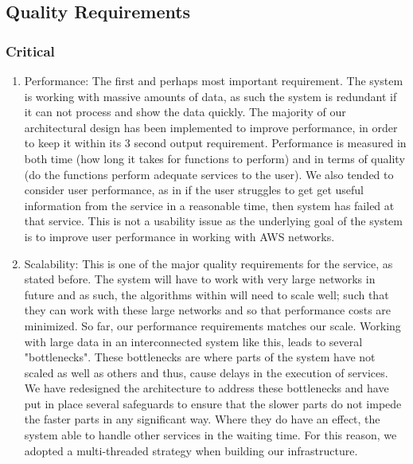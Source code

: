 \documentclass[hidelinks,a4paper,12pt]{article}
\begin{document}
\newpage
\subsection{Quality Requirements}
\subsubsection {Critical}
\begin{enumerate} 
\item Performance: The first and perhaps most important requirement. The system is working with massive amounts of data, as such the system is redundant if it can not process and show the data quickly. The majority of our architectural design has been implemented to improve performance, in order to keep it within its 3 second output requirement. Performance is measured in both time (how long it takes for functions to perform) and in terms of quality (do the functions perform adequate services to the user). We also tended to consider user performance, as in if the user struggles to get get useful information from the service in a reasonable time, then system has failed at that service. This is not a usability issue as the underlying goal of the system is to improve user performance in working with AWS networks.
\item Scalability: This is one of the major quality requirements for the service, as stated before. The system will have to work with very large networks in future and as such, the algorithms within will need to scale well; such that they can work with these large networks and so that performance costs are minimized. So far, our performance requirements matches our scale. Working with large data in an interconnected system like this, leads to several "bottlenecks". These bottlenecks are where parts of the system have not scaled as well as others and thus, cause delays in the execution of services. We have redesigned the architecture to address these bottlenecks and have put in place several safeguards to ensure that the slower parts do not impede the faster parts in any significant way. Where they do have an effect, the system able to handle other services in the waiting time. For this reason, we adopted a multi-threaded strategy when building our infrastructure.
\end{enumerate} 
\end{document}
